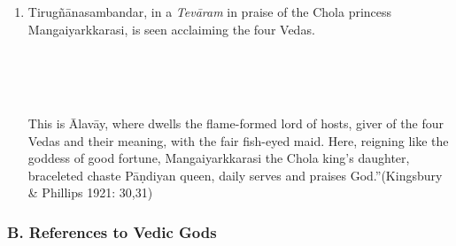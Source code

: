 \begin{enumerate}[{\rm 1.}]
 \item 
 Tirugñānasambandar, in a \textit{Tevāram} in praise of the Chola princess Mangaiyarkkarasi, is seen acclaiming the four Vedas.

\begin{myquote}
\\\\\\
\end{myquote}

\begin{myquote}
This is Ālavāy, where dwells the flame-formed lord of hosts, giver of the four Vedas and their meaning, with the fair fish-eyed maid. Here, reigning like the goddess of good fortune, Mangaiyarkkarasi the Chola king’s daughter, braceleted chaste Pāṇdiyan queen, daily serves and praises God.”\hfill (Kingsbury \& Phillips 1921: 30,31)
\end{myquote}


\end{enumerate}


\subsubsection*{B. References to Vedic Gods}

